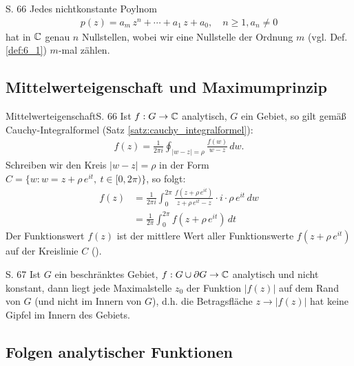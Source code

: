 \begin{satz}{S. 66}
  Jedes nichtkonstante Poylnom
  \begin{align}
    p(z) = a_m \, z^n + \cdots + a_1 \, z + a_0, \quad n \geq 1, a_n \neq 0
  \end{align}
  hat in $\mathbb{C}$ genau $n$ Nullstellen, wobei wir eine Nullstelle der Ordnung $m$ (vgl. Def. \ref{def:6_1}) $m$-mal zählen.
\end{satz}



\subsection{Mittelwerteigenschaft und Maximumprinzip}

\begin{bemerkung}{Mittelwerteigenschaft}{S. 66}
  Ist $f: G \to \mathbb{C}$ analytisch, $G$ ein Gebiet, so gilt gemäß Cauchy-Integralformel (Satz \ref{satz:cauchy_integralformel}):
  \begin{align}
    f(z) = \frac{1}{2 \pi i} \oint_{|w-z|=\rho} \frac{f(w)}{w-z} \, dw .
  \end{align}
  Schreiben wir den Kreis $|w-z|=\rho$ in der Form $C = \{ w : w = z + \rho \, e^{it}, \ t \in [0, 2 \pi) \}$, so folgt:
  \begin{align}
    f(z) &= \frac{1}{2 \pi i} \int_0^{2 \pi} \frac{f \left( z + \rho \, e^{it} \right)}{z + \rho \, e^{it}-z} \cdot i \cdot \rho \, e^{it} \, dw \\
    &= \frac{1}{2 \pi} \int_0^{2 \pi} f \left( z + \rho \, e^{it} \right) \, dt
  \end{align}
  Der Funktionswert $f(z)$ ist der mittlere Wert aller Funktionswerte\linebreak
  $f \left( z + \rho \, e^{it} \right)$ auf der Kreislinie $C$ ().
\end{bemerkung}

\begin{satz}[Maximumprinzip]{S. 67}
\label{satz:6_6}
  Ist $G$ ein beschränktes Gebiet, $f: G \cup \partial G \to \mathbb{C}$ analytisch und nicht konstant, dann liegt jede Maximalstelle $z_0$ der Funktion $|f(z)|$ auf dem Rand von $G$ (und nicht im Innern von $G$), d.h. die Betragsfläche $z \to |f(z)|$ hat keine Gipfel im Innern des Gebiets.
\end{satz}



\subsection{Folgen analytischer Funktionen}

